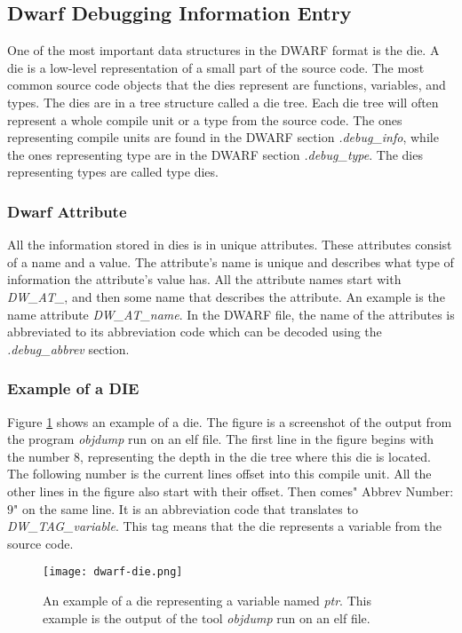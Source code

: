 \subsection{Dwarf Debugging Information Entry}
One of the most important data structures in the \gls{DWARF} format is the \gls{die}.
A \gls{die} is a low-level representation of a small part of the source code.
The most common source code objects that the \glspl{die} represent are functions, variables, and types.
The \glspl{die} are in a tree structure called a \gls{die} tree.
Each \gls{die} tree will often represent a whole compile unit or a type from the source code.
The ones representing compile units are found in the \gls{DWARF} section \emph{.debug\_info}, while the ones representing type are in the \gls{DWARF} section \emph{.debug\_type}.
The \glspl{die} representing types are called type \glspl{die}.


\subsubsection{Dwarf Attribute}\label{sec:dwarfattributes}
All the information stored in \glspl{die} is in unique attributes.
These attributes consist of a name and a value.
The attribute's name is unique and describes what type of information the attribute's value has.
All the attribute names start with \emph{DW\_AT\_}, and then some name that describes the attribute.
An example is the name attribute \emph{DW\_AT\_name}. 
In the \gls{DWARF} file, the name of the attributes is abbreviated to its abbreviation code which can be decoded using the \emph{.debug\_abbrev} section.


\subsubsection{Example of a DIE}
Figure \ref{fig:dwarfdie} shows an example of a \gls{die}.
The figure is a screenshot of the output from the program \emph{objdump} run on an \gls{elf} file.
The first line in the figure begins with the number $8$, representing the depth in the \gls{die} tree where this \gls{die} is located.
The following number is the current lines offset into this compile unit.
All the other lines in the figure also start with their offset.
Then comes" Abbrev Number: $9$" on the same line.
It is an abbreviation code that translates to \emph{DW\_TAG\_variable}.
This tag means that the \gls{die} represents a variable from the source code.


\begin{figure}[h]
	\centering
	\texttt{[image: dwarf-die.png]}
	\caption{An example of a \gls{die} representing a variable named \emph{ptr}. This example is the output of the tool \emph{objdump} run on an \gls{elf} file.}
	\label{fig:dwarfdie}
\end{figure}


